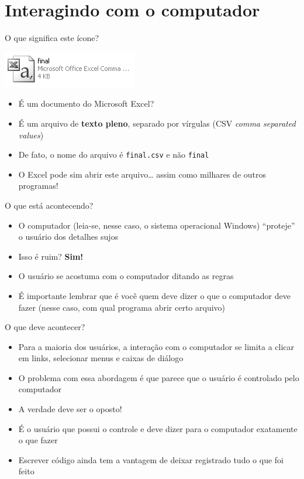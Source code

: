 \documentclass[10pt,a4paper]{book}
\providecommand{\tightlist}{%
  \setlength{\itemsep}{0pt}\setlength{\parskip}{0pt}}
\begin{document}
\section{Interagindo com o
computador}\label{interagindo-com-o-computador}

O que significa este ícone?

\begin{center}\includegraphics[width=0.5\linewidth]{img/excelcsvgrey} \end{center}

\begin{itemize}
\tightlist
\item
  É um documento do Microsoft Excel?
\item
  É um arquivo de \textbf{texto pleno}, separado por vírgulas (CSV
  \emph{comma separated values})
\item
  De fato, o nome do arquivo é \texttt{final.csv} e não \texttt{final}
\item
  O Excel pode sim abrir este arquivo\ldots{} assim como milhares de
  outros programas!
\end{itemize}

O que está acontecendo?

\begin{itemize}
\tightlist
\item
  O computador (leia-se, nesse caso, o sistema operacional Windows)
  ``proteje'' o usuário dos detalhes sujos
\item
  Isso é ruim? \textbf{Sim!}
\item
  O usuário se acostuma com o computador ditando as regras
\item
  É importante lembrar que é você quem deve dizer o que o computador
  deve fazer (nesse caso, com qual programa abrir certo arquivo)
\end{itemize}

O que deve acontecer?

\begin{itemize}
\tightlist
\item
  Para a maioria dos usuários, a interação com o computador se limita a
  clicar em links, selecionar menus e caixas de diálogo
\item
  O problema com essa abordagem é que parece que o usuário é controlado
  pelo computador
\item
  A verdade deve ser o oposto!
\item
  É o usuário que possui o controle e deve dizer para o computador
  exatamente o que fazer
\item
  Escrever código ainda tem a vantagem de deixar registrado tudo o que
  foi feito
\end{itemize}
\end{document}
